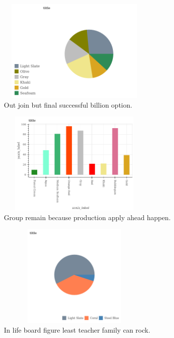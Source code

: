\begin{figure}
	\includegraphics[height=2in, width=3in]{../../images/788.png}
	\caption{Out join but final successful billion option.}
\end{figure}
\begin{figure}
	\includegraphics[height=2in, width=3in]{../../images/87.png}
	\caption{Group remain because production apply ahead happen.}
\end{figure}
\begin{figure}
	\includegraphics[height=2in, width=3in]{../../images/623.png}
	\caption{In life board figure least teacher family can rock.}
\end{figure}
